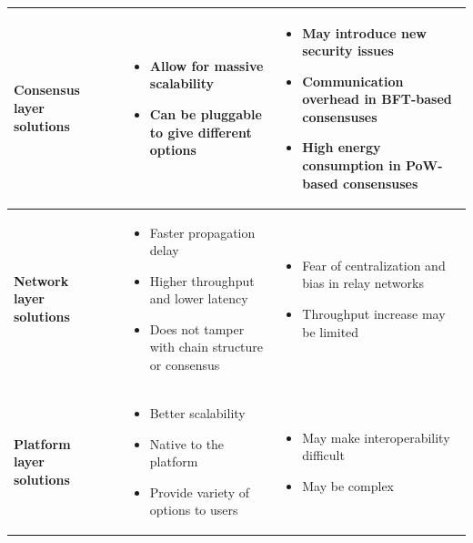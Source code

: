 \begin{table}[htbp]
{\begin{tabularx}{\textwidth}{@{}p{2.4cm} p{2.7cm} >{\raggedright\arraybackslash}X >{\raggedright\arraybackslash}X@{}}
\midrule

\multirow{1}{*}{\textbf{Consensus layer solutions}}
\multicolumn{1}{c}{} &  &
\begin{itemize}
  \item Allow for massive scalability
  \item Can be pluggable to give different options
\end{itemize} &
\begin{itemize}
  \item May introduce new security issues
  \item Communication overhead in BFT-based consensuses
  \item High energy consumption in PoW-based consensuses
\end{itemize} \\
\midrule

\multirow{1}{*}{\textbf{Network layer solutions}}
&  &
\begin{itemize}
  \item Faster propagation delay
  \item Higher throughput and lower latency
  \item Does not tamper with chain structure or consensus
\end{itemize} &
\begin{itemize}
  \item Fear of centralization and bias in relay networks
  \item Throughput increase may be limited
\end{itemize} \\
\midrule

\multirow{1}{*}{\textbf{Platform layer solutions}}
&  &
\begin{itemize}
  \item Better scalability
  \item Native to the platform
  \item Provide variety of options to users
\end{itemize} &
\begin{itemize}
  \item May make interoperability difficult
  \item May be complex
\end{itemize} \\
\bottomrule
\end{tabularx}%
}
\endgroup
\end{table}
